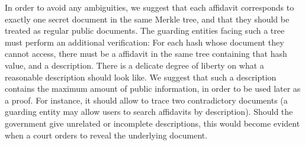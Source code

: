 In order to avoid any ambiguities, we suggest that each affidavit corresponds to exactly one secret document in the same Merkle tree, and that they should be treated as regular public documents. The guarding entities facing such a tree must perform an additional verification: For each hash whose document they cannot access, there must be a affidavit in the same tree containing that hash value, and a description. There is a delicate degree of liberty on what a reasonable description should look like. We suggest that such a description contains the maximum amount of public information, in order to be used later as a proof. For instance, it should allow to trace two contradictory documents (a guarding entity may allow users to search affidavits by description). Should the government give unrelated or incomplete descriptions, this would become evident when a court orders to reveal the underlying document. 




